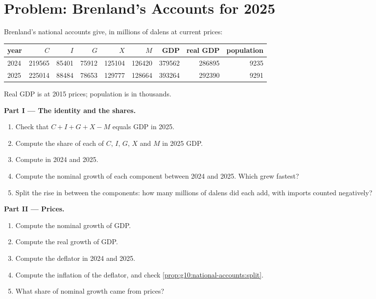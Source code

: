\section{Problem: Brenland's Accounts for 2025}

\begin{problem}
\label{pb:g10:national-accounts:1}
Brenland's national accounts give, in millions of dalens at current prices:
\begin{center}
\small
\begin{tabular}{l r r r r r r r r}
\toprule
year & $C$ & $I$ & $G$ & $X$ & $M$ & GDP & real GDP & population \\
\midrule
2024 & \num{219565} & \num{85401} & \num{75912} & \num{125104} & \num{126420} & \num{379562} & \num{286895} & \num{9235} \\
2025 & \num{225014} & \num{88484} & \num{78653} & \num{129777} & \num{128664} & \num{393264} & \num{292390} & \num{9291} \\
\bottomrule
\end{tabular}
\end{center}
Real GDP is at 2015 prices; population is in thousands.

\medskip
\noindent\textbf{Part I --- The identity and the shares.}
\begin{enumerate}
\item Check that $C + I + G + X - M$ equals GDP in 2025.
\item Compute the share of each of $C$, $I$, $G$, $X$ and $M$ in 2025 GDP.
\item Compute  in 2024 and 2025.
\item Compute the nominal growth of each component between 2024 and 2025. Which grew fastest?
\item Split the rise in  between the components: how many millions of dalens did each add, with imports counted negatively?
\end{enumerate}

\medskip
\noindent\textbf{Part II --- Prices.}
\begin{enumerate}[resume]
\item Compute the nominal growth of GDP.
\item Compute the real growth of GDP.
\item Compute the deflator in 2024 and 2025.
\item Compute the inflation of the deflator, and check \cref{prop:g10:national-accounts:split}.
\item What share of nominal growth came from prices?
\end{enumerate}


\end{problem}

